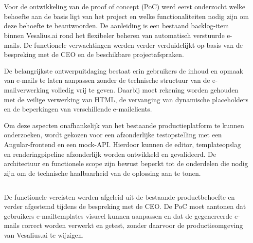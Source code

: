 
\chapter{}%
\label{ch:ontwerp}
Voor de ontwikkeling van de proof of concept (PoC) werd eerst onderzocht
welke behoefte aan de basis ligt van het project en welke functionaliteiten
nodig zijn om deze behoefte te beantwoorden. De aanleiding is een bestaand
backlog-item binnen Vesalius.ai rond het flexibeler beheren van automatisch
verstuurde e-mails. De functionele verwachtingen werden verder verduidelijkt
op basis van de bespreking met de CEO en de beschikbare projectafspraken.

De belangrijkste ontwerpuitdaging bestaat erin gebruikers de inhoud en opmaak
van e-mails te laten aanpassen zonder de technische structuur van de
e-mailverwerking volledig vrij te geven. Daarbij moet rekening worden gehouden
met de veilige verwerking van HTML, de vervanging van dynamische placeholders
en de beperkingen van verschillende e-mailclients.

Om deze aspecten onafhankelijk van het bestaande productieplatform te kunnen
onderzoeken, wordt gekozen voor een afzonderlijke testopstelling met een
Angular-frontend en een mock-API. Hierdoor kunnen de editor, templateopslag
en renderingpipeline afzonderlijk worden ontwikkeld en gevalideerd. De
architectuur en functionele scope zijn bewust beperkt tot de onderdelen die
nodig zijn om de technische haalbaarheid van de oplossing aan te tonen.

\section{}%
\label{sec:vereisten}
De functionele vereisten werden afgeleid uit de bestaande productbehoefte en
verder afgestemd tijdens de bespreking met de CEO. De PoC moet aantonen dat
gebruikers e-mailtemplates visueel kunnen aanpassen en dat de gegenereerde
e-mails correct worden verwerkt en getest, zonder daarvoor de productieomgeving
van Vesalius.ai te wijzigen.

